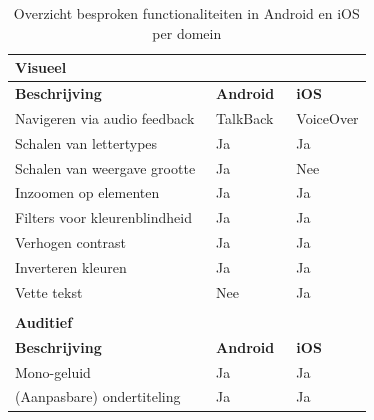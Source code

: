 \begin{table}
    \centering
    \caption{Overzicht besproken functionaliteiten in Android en iOS per domein}
    \label{overzichtFunctionaliteitenBesproken}
    \begin{tabular}{|l|l|l|} 
        \hline
        \multicolumn{3}{|l|}{\textbf{Visueel} }                                                        \\ 
        \hline
        \textbf{Beschrijving}                                 & \textbf{Android}  & \textbf{iOS}       \\ 
        \hline
        Navigeren via audio feedback                          & TalkBack          & VoiceOver          \\ 
        \hline
        Schalen van lettertypes                               & Ja                & Ja                 \\ 
        \hline
        Schalen van weergave grootte~                         & Ja                & Nee                \\ 
        \hline
        Inzoomen op elementen                                 & Ja                & Ja                 \\ 
        \hline
        Filters voor kleurenblindheid                         & Ja                & Ja                 \\ 
        \hline
        Verhogen contrast~                                    & Ja                & Ja                 \\ 
        \hline
        Inverteren kleuren                                    & Ja                & Ja                 \\ 
        \hline
        Vette tekst                                           & Nee~              & Ja                 \\ 
        \hline
        \multicolumn{3}{|l|}{}                                                                         \\ 
        \hline
        \multicolumn{3}{|l|}{\textbf{Auditief}}                                                        \\ 
        \hline
        \textbf{Beschrijving}                                 & \textbf{Android~} & \textbf{iOS}       \\ 
        \hline
        Mono-geluid                                           & Ja                & Ja                 \\ 
        \hline
        (Aanpasbare) ondertiteling                            & Ja                & Ja                 \\ 

\end{tabular}
\end{table}
